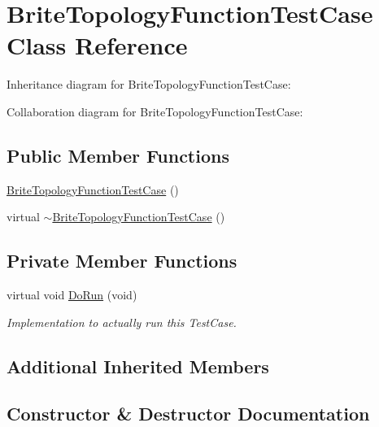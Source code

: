 \hypertarget{classBriteTopologyFunctionTestCase}{}\section{Brite\+Topology\+Function\+Test\+Case Class Reference}
\label{classBriteTopologyFunctionTestCase}


Inheritance diagram for Brite\+Topology\+Function\+Test\+Case\+:


Collaboration diagram for Brite\+Topology\+Function\+Test\+Case\+:
\subsection*{Public Member Functions}
\begin{DoxyCompactItemize}
\item 
\hyperlink{classBriteTopologyFunctionTestCase_a9bbcf8bd62aee233f356ba8cb5384e3c}{Brite\+Topology\+Function\+Test\+Case} ()
\item 
virtual \hyperlink{classBriteTopologyFunctionTestCase_a46a2525c3edbe023c0e22d1a3b495c88}{$\sim$\+Brite\+Topology\+Function\+Test\+Case} ()
\end{DoxyCompactItemize}
\subsection*{Private Member Functions}
\begin{DoxyCompactItemize}
\item 
virtual void \hyperlink{classBriteTopologyFunctionTestCase_a8646dcfe4cd680f0fb25c5f70b2b46d6}{Do\+Run} (void)
\begin{DoxyCompactList}\small\item\em Implementation to actually run this Test\+Case. \end{DoxyCompactList}\end{DoxyCompactItemize}
\subsection*{Additional Inherited Members}


\subsection{Constructor \& Destructor Documentation}
